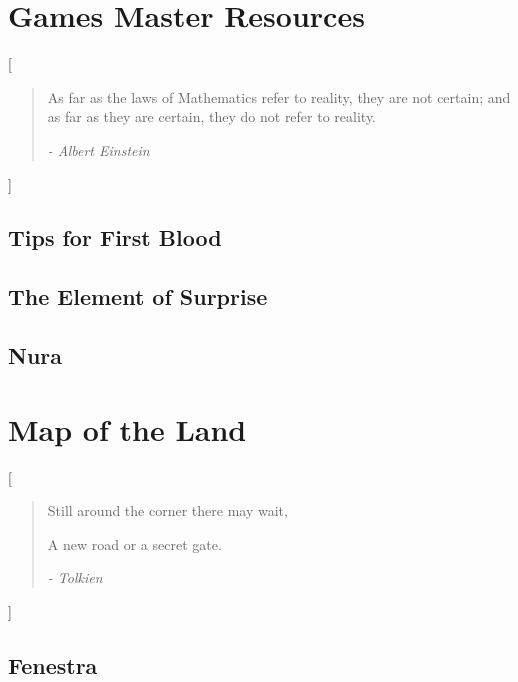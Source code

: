 \documentclass[a4paper,openany]{report}
\begin{document}
\tableofcontents

\pagebreak




\part{Games Master Resources}
[\vspace{4cm}\begin{quote}
\center As far as the laws of Mathematics refer to reality, they are not certain; and as far as they are certain, they do not refer to reality.

\flushright	\textit{- Albert Einstein}
\end{quote}]


\chapter{Tips for First Blood}



\chapter[Random Things]{The Element of Surprise}



\chapter{Nura}



\part{Map of the Land}
[\vspace{4cm}\center \begin{quote}Still around the corner there may wait,

A new road or a secret gate.

	\flushright\textit{- Tolkien}
\end{quote}]

\chapter{Fenestra}


\end{document}
